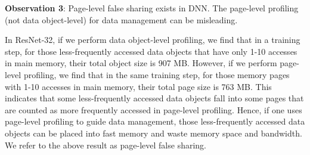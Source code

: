 \textbf{Observation 3}: Page-level false sharing exists in DNN. The page-level profiling (not data object-level) for data management can be misleading. 

\textcolor{check}{In ResNet-32, if we perform data object-level profiling, we find that in a training step, for those less-frequently accessed data objects that have only 1-10 accesses in main memory, their total object size is 907 MB. However, if we perform page-level profiling, we find that in the same training step, for those memory pages with 1-10 accesses in main memory, their total page size is 763 MB.  This indicates that some less-frequently accessed data objects fall into some pages that are counted as more frequently accessed in page-level profiling. Hence, if one uses page-level profiling to guide data management, those less-frequently accessed data objects can be placed into fast memory and waste memory space and bandwidth. We refer to the above result as page-level false sharing. }


